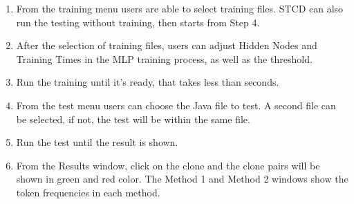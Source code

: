 \documentclass[../main.tex]{subfiles}
\begin{document}
\begin{enumerate}
\item From the training menu users are able to select training files. STCD can also run the testing without training, then starts from Step 4.
\item After the selection of training files, users can adjust Hidden Nodes and Training Times in the MLP training process, as well as the threshold. 
\item Run the training until it's ready, that takes less than seconds. 
\item From the test menu users can choose the Java file to test. A second file can be selected, if not, the test will be within the same file. 
\item Run the test until the result is shown.
\item From the Results window, click on the clone and the clone pairs will be shown in green and red color. The Method 1 and Method 2 windows show the token frequencies in each method.  
\end{enumerate}
\end{document}
